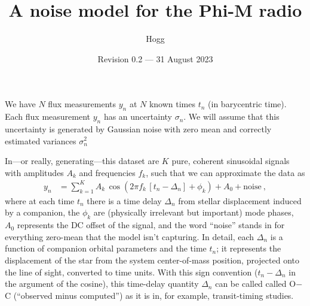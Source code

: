 \documentclass[12pt]{article}
\title{\bfseries A noise model for the Phi-M radio}
\author{Hogg}
\date{Revision 0.2 --- 31 August 2023}
\begin{document}
\maketitle

\noindent
We have $N$ flux measurements $y_n$ at $N$ known times $t_n$ (in barycentric time).
Each flux measurement $y_n$ has an uncertainty $\sigma_n$.
We will assume that this uncertainty is generated by Gaussian noise with zero mean and correctly estimated variances $\sigma_n^2$

In---or really, generating---this dataset are $K$ pure, coherent sinusoidal signals with amplitudes $A_k$ and frequencies $f_k$, such that we can approximate the data as
\begin{align}
    y_n &= \sum_{k=1}^K A_k\,\cos(2\pi f_k\,[t_n - \Delta_n] + \phi_k) + A_0 + \mbox{noise} ~,\label{eq:model}
\end{align}
where at each time $t_n$ there is a time delay $\Delta_n$ from stellar displacement induced by a companion, the $\phi_k$ are (physically irrelevant but important) mode phases, $A_0$ represents the DC offset of the signal, and the word ``noise'' stands in for everything zero-mean that the model isn't capturing.
In detail, each $\Delta_n$ is a function of companion orbital parameters and the time $t_n$; it represents the displacement of the star from the system center-of-mass position, projected onto the line of sight, converted to time units.
With this sign convention ($t_n - \Delta_n$ in the argument of the cosine), this time-delay quantity $\Delta_n$ can be called called O$-$C (``observed minus computed'') as it is in, for example, transit-timing studies.
\end{document}

